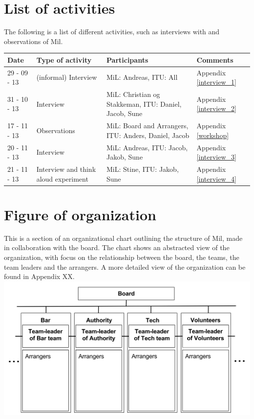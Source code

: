 \section{List of activities}
The following is a list of different activities, such as interviews with and observations of Mil.
\begin{center}
\begin{table}[H]
    \begin{tabular}{|p{3cm}|p{3cm}|p{3cm}|p{6cm}|}
    \hline
    \textbf{Date} & \textbf{Type of activity} & \textbf{Participants} & \textbf{Comments} \\ \hline
    29 - 09 - 13 & (informal) Interview & MiL: Andreas, ITU: All & Appendix  \ref{interview_1}\\ \hline
    31 - 10 - 13 & Interview & MiL: Christian og Stakkeman, ITU: Daniel, Jacob, Sune &  Appendix \ref{interview_2}  \\ \hline
    17 - 11 - 13 & Observations & MiL: Board and Arrangers, ITU: Anders, Daniel, Jacob & Appendix \ref{workshop} \\ \hline
    20 - 11 - 13 & Interview & MiL: Andreas, ITU: Jacob, Jakob, Sune & Appendix \ref{interview_3} \\ \hline
    21 - 11 - 13 & Interview and think aloud experiment & MiL: Stine, ITU: Jakob, Sune & Appendix \ref{interview_4} \\ \hline
    \end{tabular}
\end{table}
\end{center}

\section{Figure of organization}
\label{sec:organisation}
This is a section of an organizational chart outlining the structure of Mil, made in collaboration with the board. The chart shows an abstracted view of the organization, with focus on the relationship between the board, the teams, the team leaders and the arrangers. A more detailed view of the organization can be found in Appendix XX.\\
\includegraphics[scale=0.7]{Pictures/MIL_Organisational_chart_Abstract.png}
